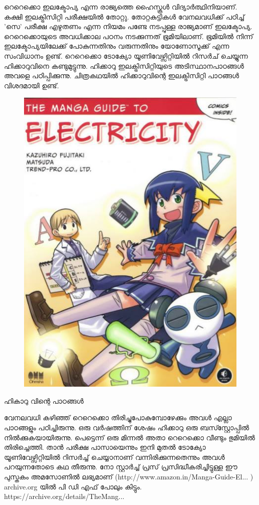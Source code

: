 \documentclass[10pt,a4paper]{report}
\begin{document}
    റെറെക്കൊ ഇലക്ടോപ്യ എന്ന രാജ്യത്തെ ഹൈസ്കൂള്‍ വിദ്യാര്‍ത്ഥിനിയാണ്. കക്ഷി ഇലക്ട്രിസിറ്റി പരീക്ഷയില്‍ തോറ്റു. തോറ്റകുട്ടികള്‍ വേനലവധിക്ക് പഠിച്ച് 'സെ' പരീക്ഷ എഴുതണം എന്ന നിയമം പണ്ടേ നടപ്പുള്ള രാജ്യമാണ് ഇലക്ടോപ്യ. റെറെക്കൊയുടെ അവധിക്കാല പഠനം നടക്കുന്നത് ഭൂമിയിലാണ്. ഭൂമിയില്‍ നിന്ന് ഇലക്ടോപ്യയിലേക്ക് പോകുന്നതിനും വരുന്നതിനും യോണോസൂക്ക് എന്ന സംവിധാനം ഉണ്ട്. റെറെക്കൊ ടോക്യോ യൂണിവേഴ്സിറ്റിയില്‍ റിസര്‍ച് ചെയ്യുന്ന ഹിക്കാറുവിനെ കണ്ടുമുട്ടുന്നു. ഹിക്കാറു ഇലക്ട്രിസിറ്റിയുടെ അടിസ്ഥാനപാഠങ്ങള്‍ അവളെ പഠിപ്പിക്കുന്നു. ചിത്രകഥയില്‍ ഹിക്കാറുവിന്റെ ഇലക്ട്രിസിറ്റി പാഠങ്ങള്‍ വിശദമായി ഉണ്ട്. 
 \begin{figure}[H]
  \center
\includegraphics[scale=.25]{images/manga4}
\label{manga4}
\caption{   }
\end{figure}
ഹികാറു വിന്റെ പാഠങ്ങൾ

  വേനലവധി കഴിഞ്ഞ് റെറെക്കൊ തിരിച്ചുപോകുമ്പോഴേക്കും അവള്‍ എല്ലാ പാഠങ്ങളും പഠിച്ചിരുന്നു. ഒരു വര്‍ഷത്തിന് ശേഷം ഹിക്കാറു ഒരു ബസ്സ്റ്റോപ്പില്‍ നില്‍ക്കുകയായിരുന്നു. പെട്ടെന്ന് ഒരു മിന്നല്‍ അതാ റെറെക്കൊ വീണ്ടും ഭുമിയില്‍ തിരിച്ചെത്തി. താന്‍ പരീക്ഷ പാസായെന്നും ഇനി മുതല്‍ ടോക്യോ യൂണിവേഴ്സിറ്റിയില്‍ റിസര്‍ച്ച് ചെയ്യാനാണ് വന്നിരിക്കുന്നതെന്നും അവള്‍ പറയുന്നതോടെ കഥ തീരുന്നു. നോ സ്റ്റാര്‍ച്ച് പ്രസ് പ്രസിദ്ധീകരിച്ചിട്ടുള്ള ഈ പുസ്തകം അമസോണില്‍ ലഭ്യമാണ്  (http://www.amazon.in/Manga-Guide-El...   ) archive.org യിൽ പി ഡി എഫ് പോലും കിട്ടും. https://archive.org/details/TheMang...   
\end{document}
